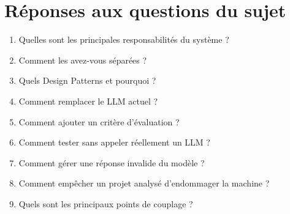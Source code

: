 \documentclass[11pt,a4paper]{report}
\begin{document}
\chapter{Réponses aux questions du sujet}                 %
\begin{enumerate}
  \item Quelles sont les principales responsabilités du système ?  %
  \item Comment les avez-vous séparées ?                           %
  \item Quels Design Patterns et pourquoi ?                        %
  \item Comment remplacer le LLM actuel ?                          %
  \item Comment ajouter un critère d'évaluation ?                  %
  \item Comment tester sans appeler réellement un LLM ?            %
  \item Comment gérer une réponse invalide du modèle ?             %
  \item Comment empêcher un projet analysé d'endommager la machine ? %
  \item Quels sont les principaux points de couplage ?             %
\end{enumerate}
\end{document}
